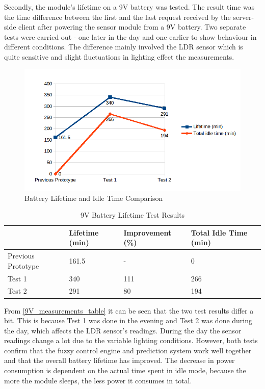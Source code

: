 Secondly, the module's lifetime on a 9V battery was tested. The result time was the time difference between the first and the last request received by the server-side client after powering the sensor module from a 9V battery. Two separate tests were carried out - one later in the day and one earlier to show behaviour in different conditions. The difference mainly involved the LDR sensor which is quite sensitive and slight fluctuations in lighting effect the measurements. 

\begin{figure}[h!]
\centering
\includegraphics[scale=0.9]{4/figures/9V_test_results.png}
\caption{Battery Lifetime and Idle Time Comparison}
\label{9V_test_results}
\end{figure}

\begin{table}[h]
\centering
  \begin{tabular}{|l|l|l|l|}
    \hline
     & Lifetime (min) & Improvement (\%) & Total Idle Time (min)\\ \hline
    Previous Prototype & 161.5 & - & 0\\ \hline
    Test 1 & 340 & 111 & 266 \\ \hline
    Test 2 & 291 & 80 & 194 \\ \hline
  \end{tabular}
\caption{9V Battery Lifetime Test Results}
\label{9V_measurements_table}
\end{table}

From \autoref{9V_measurements_table} it can be seen that the two test results differ a bit. This is because Test 1 was done in the evening and Test 2 was done during the day, which affects the LDR sensor's readings. During the day the sensor readings change a lot due to the variable lighting conditions. However, both tests confirm that the fuzzy control engine and prediction system work well together and that the overall battery lifetime has improved. The decrease in power consumption is dependent on the actual time spent in idle mode, because the more the module sleeps, the less power it consumes in total. 

